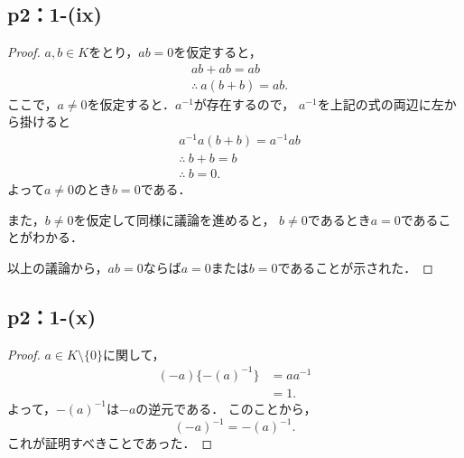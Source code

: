 \documentclass[a4paper,10pt,fleqn]{ltjsarticle}
\begin{document}
\subsection*{p2：1-(ix)}

\begin{leftbar}
    \begin{proof}
        $ a, b \in K$をとり，$ab =0$を仮定すると，
        \begin{align*}
            & ab + ab = ab \\
            & \therefore ~ a(b+b)=ab.
        \end{align*} 
        ここで，$a \ne 0$を仮定すると．$a^{-1}$が存在するので，
        $a^{-1}$を上記の式の両辺に左から掛けると
        \begin{align*} 
            & a^{-1}a(b+b)=a^{-1}ab \\
            & \therefore ~ b+b=b \\
            & \therefore ~ b=0.
        \end{align*} 
        よって$a \ne 0$のとき$b=0$である．

        また，$b \ne 0$を仮定して同様に議論を進めると，
        $b \ne 0$であるとき$ a=0$であることがわかる．

        以上の議論から，$ab=0$ならば$a=0$または$b=0$であることが示された．
    \end{proof}
\end{leftbar}

\subsection*{p2：1-(x)}

\begin{leftbar}
    \begin{proof}
        $ a \in K \setminus \{ 0 \} $に関して，
        \begin{align*} 
            (-a) \{ -(a)^{-1} \} &= aa^{-1} \\
            & =1.
        \end{align*}
        よって，$-(a)^{-1}$は$-a$の逆元である．
        このことから，
        \[
        (-a)^{-1} = -(a)^{-1}.
        \]
        これが証明すべきことであった．
    \end{proof}
\end{leftbar}
\end{document}
